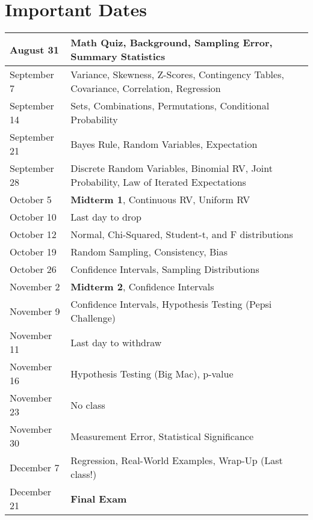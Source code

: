 \documentclass[11pt, letterpaper]{article}
\begin{document}
\newpage

\section*{Important Dates}
\begin{center}
	\begin{tabular}{| l | l |}
		\hline
		August 31 		& \textbf{Math Quiz}, Background, Sampling Error, Summary Statistics \\ \hline
		September 7 	& Variance, Skewness, Z-Scores, Contingency Tables, Covariance, Correlation, Regression \\ \hline
		September 14	& Sets, Combinations, Permutations, Conditional Probability \\ \hline
		September 21	& Bayes Rule, Random Variables, Expectation \\ \hline
		September 28	& Discrete Random Variables, Binomial RV, Joint Probability, Law of Iterated Expectations  \\ \hline
		October 5		& \textbf{Midterm 1}, Continuous RV, Uniform RV  \\ \hline
		October 10		& Last day to drop \\ \hline
		October 12		& Normal, Chi-Squared, Student-t, and F distributions  \\ \hline
		October 19		& Random Sampling, Consistency, Bias   \\ \hline
		October 26		& Confidence Intervals, Sampling Distributions  \\ \hline
		November 2		& \textbf{Midterm 2}, Confidence Intervals \\ \hline
		November 9		& Confidence Intervals, Hypothesis Testing (Pepsi Challenge)\\ \hline
		November 11	& Last day to withdraw \\ \hline
		November 16	& Hypothesis Testing (Big Mac), p-value \\ \hline
		November 23	& No class \\ \hline
		November 30	& Measurement Error, Statistical Significance  \\ \hline
		December 7		& Regression, Real-World Examples, Wrap-Up (Last class!)\\ \hline
		December 21	& \textbf{Final Exam} \\ \hline
	
	\end{tabular}
\end{center}
\end{document}
